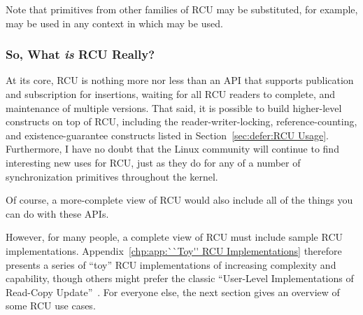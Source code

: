 Note that primitives from other families of RCU may be substituted,
for example,  may be used in any context
in which  may be used.

\subsubsection{So, What \emph{is} RCU Really?}
\label{sec:defer:So, What is RCU Really?}

At its core, RCU is nothing more nor less than an API that supports
publication and subscription for insertions, waiting for all RCU readers
to complete, and maintenance of multiple versions.
That said, it is possible to build higher-level constructs
on top of RCU, including the reader-writer-locking, reference-counting,
and existence-guarantee constructs listed in
Section~\ref{sec:defer:RCU Usage}.
Furthermore, I have no doubt that the Linux community will continue to
find interesting new uses for RCU,
just as they do for any of a number of synchronization
primitives throughout the kernel.

Of course, a more-complete view of RCU would also include
all of the things you can do with these APIs.

However, for many people, a complete view of RCU must include sample
RCU implementations.
Appendix~\ref{chp:app:``Toy'' RCU Implementations} therefore presents a series
of ``toy'' RCU implementations of increasing complexity and capability,
though others might prefer the classic
``User-Level Implementations of Read-Copy
Update''~\cite{MathieuDesnoyers2012URCU}.
For everyone else, the next section gives an overview of some RCU use cases.
